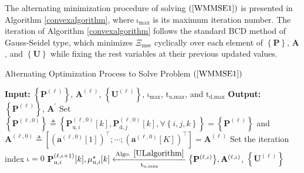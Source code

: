 \documentclass[9pt,journal]{IEEEtran}
\newcommand{\paren}[1]{\left({#1}\right)}
\newcommand{\bracket}[1]{{\left [{#1}\right ]}}
\newcommand{\braces}[1]{{\left\{ {#1}\right\}}}
\begin{document}
The alternating minimization procedure of solving $\paren{\ref{WMMSE1}}$ is presented in Algorithm \ref{convexalgorithm}, where $\mathrm{\iota}_{\textrm{max}}$ is its maximum iteration number. The iteration of Algorithm \ref{convexalgorithm} follows the standard BCD method of Gauss-Seidel type, which minimizes $\Xi_{\text{mse}}$ cyclically over each element of $\braces{\mathbf{P}}$, $\mathbf{A}$, and $\braces{\mathbf{U}}$ while fixing the rest variables at their previous updated values. 
\begin{algorithm}[ht!]
	\caption{Alternating Optimization Process to Solve Problem $\paren{\ref{WMMSE1}}$}
	\label{convexalgorithm}
	\begin{algorithmic}[1]
		\Statex \textbf{Input:} $\braces{\mathbf{P}^{\paren{\mathrm{\ell}}}}$, $\mathbf{A}^{\paren{\mathrm{\ell}}}$, $\braces{\mathbf{U}^{\paren{\mathrm{\ell}}}}$, $\mathrm{\iota}_{\textrm{max}}$, $\mathrm{t}_{\textrm{u,max}}$, and $\mathrm{t}_{\textrm{d,max}}$
		\Statex \textbf{Output: } $\braces{\mathbf{P}^{\paren{\ell}}}$, $\mathbf{A}^{\prime}$
		\State Set $\braces{\mathbf{P}^{\paren{\mathrm{\ell,0}}}}\triangleq\braces{\mathbf{P}^{\paren{\mathrm{\ell,0}}}_{\textrm{u},i}\bracket{k},\mathbf{P}^{\paren{\mathrm{\ell,0}}}_{\textrm{d},j}\bracket{k}, \forall \braces{i,j,k}}=\braces{\mathbf{P}^{\paren{\mathrm{\ell}}}}
		$ and $\mathbf{A}^{\paren{\mathrm{\ell,0}}}\triangleq\bracket{\paren{\mathbf{a}^{\paren{\mathrm{\ell,0}}}\bracket{1}}^\top;\cdots;\paren{\mathbf{a}^{\paren{\mathrm{\ell,0}}}\bracket{\mathrm{\mathit{K}}}}^\top}=\mathbf{A}^{\paren{\mathrm{\ell}}}$
		\State Set the iteration index $\mathrm{\iota}=0$ 
		\Repeat
		\label{stepk} %
		\State $\mathbf{P}^{\paren{\mathrm{\ell,\iota+1}}}_{\textrm{u},i}\bracket{k},\mu^\star_{\textrm{u},i}\bracket{k}\xleftarrow[\mathrm{t}_{\textrm{u,max}}]{\textrm{Algo. }\ref{ULalgorithm}}\braces{\mathbf{P}^{\paren{\mathrm{\ell,\iota}}}},\mathbf{A}^{\paren{\mathrm{\ell,\iota}}}$, $\braces{\mathbf{U}^{\paren{\mathrm{\ell}}}}$
		\EndFor

\end{algorithmic}
\end{algorithm}
\end{document}
